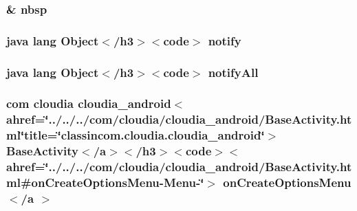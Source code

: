 \hypertarget{_splash_activity_8html_aef915316f784c9063d942974538301a6}{
\subsubsection[{nbsp}]{\setlength{\rightskip}{0pt plus 5cm}\& nbsp}}\label{_splash_activity_8html_aef915316f784c9063d942974538301a6}
\hypertarget{_splash_activity_8html_ae99ae10b5010594dbda4794e02db271b}{
\subsubsection[{notify}]{\setlength{\rightskip}{0pt plus 5cm}java lang Object$<$/h3$>$$<$code$>$ notify}}\label{_splash_activity_8html_ae99ae10b5010594dbda4794e02db271b}
\hypertarget{_splash_activity_8html_a1279357e6e09e33e75b55eb05fdb6436}{
\subsubsection[{notify\-All}]{\setlength{\rightskip}{0pt plus 5cm}java lang Object$<$/h3$>$$<$code$>$ notify\-All}}\label{_splash_activity_8html_a1279357e6e09e33e75b55eb05fdb6436}
\hypertarget{_splash_activity_8html_a624d351f7879c37d4dbd43acf019df6c}{
\subsubsection[{on\-Create\-Options\-Menu$<$/a $>$}]{\setlength{\rightskip}{0pt plus 5cm}com cloudia cloudia\-\_\-android$<$ahref=\char`\"{}../../../com/cloudia/cloudia\-\_\-android/Base\-Activity.\-html\char`\"{}title=\char`\"{}classincom.\-cloudia.\-cloudia\-\_\-android\char`\"{}$>$ Base\-Activity$<$/{\bf a}$>$$<$/h3$>$$<$code$>$$<$ahref=\char`\"{}../../../com/cloudia/cloudia\-\_\-android/Base\-Activity.\-html\#{\bf on\-Create\-Options\-Menu}-\/Menu-\/\char`\"{}$>$ on\-Create\-Options\-Menu$<$/{\bf a} $>$}}\label{_splash_activity_8html_a624d351f7879c37d4dbd43acf019df6c}
